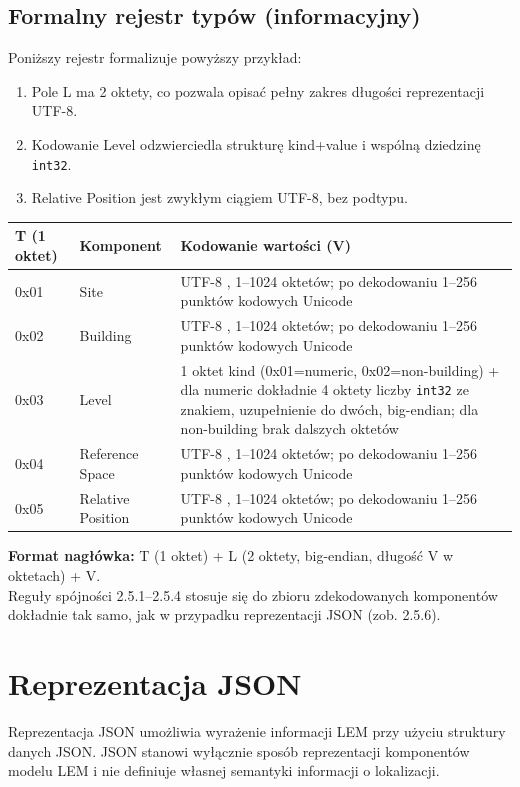 \subsection{Formalny rejestr typów (informacyjny)}
\label{sec:rejestr-typow}
Poniższy rejestr formalizuje powyższy przykład:
\begin{enumerate}
    \item Pole L ma 2 oktety, co pozwala opisać pełny zakres długości reprezentacji UTF-8.
    \item Kodowanie Level odzwierciedla strukturę kind+value i wspólną dziedzinę \texttt{int32}.
    \item Relative Position jest zwykłym ciągiem UTF-8, bez podtypu.
\end{enumerate}

\begin{table}[h]
\centering
\small
\begin{tabular}{|l|l|p{8cm}|}
\hline
\textbf{T (1 oktet)} & \textbf{Komponent} & \textbf{Kodowanie wartości (V)} \\ \hline
0x01 & Site & UTF-8 \cite{RFC3629}, 1--1024 oktetów; po dekodowaniu 1--256 punktów kodowych Unicode \\ \hline
0x02 & Building & UTF-8 \cite{RFC3629}, 1--1024 oktetów; po dekodowaniu 1--256 punktów kodowych Unicode \\ \hline
0x03 & Level & 1 oktet kind (0x01=numeric, 0x02=non-building) + dla numeric dokładnie 4 oktety liczby \texttt{int32} ze znakiem, uzupełnienie do dwóch, big-endian; dla non-building brak dalszych oktetów \\ \hline
0x04 & Reference Space & UTF-8 \cite{RFC3629}, 1--1024 oktetów; po dekodowaniu 1--256 punktów kodowych Unicode \\ \hline
0x05 & Relative Position & UTF-8 \cite{RFC3629}, 1--1024 oktetów; po dekodowaniu 1--256 punktów kodowych Unicode \\ \hline
\end{tabular}
\end{table}

\noindent \textbf{Format nagłówka:} T (1 oktet) + L (2 oktety, big-endian, długość V w oktetach) + V.\\
Reguły spójności 2.5.1–2.5.4 stosuje się do zbioru zdekodowanych komponentów dokładnie tak samo, jak w przypadku reprezentacji JSON (zob. 2.5.6).

\section{Reprezentacja JSON}
\label{sec:reprezentacja-json}
Reprezentacja JSON umożliwia wyrażenie informacji LEM przy użyciu struktury danych JSON. JSON stanowi wyłącznie sposób reprezentacji komponentów modelu LEM i nie definiuje własnej semantyki informacji o lokalizacji.

